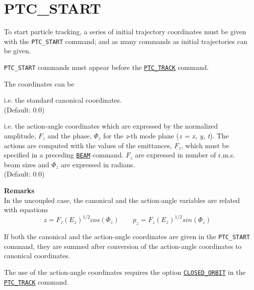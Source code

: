 \section{PTC\_START}
\label{sec:ptc-start}

To start particle tracking, a series of initial trajectory coordinates
must be given with the \texttt{PTC\_START} command;  and as many
commands as initial trajectories can be given. 

\texttt{PTC\_START} commands must appear before the
\hyperref[sec:ptc-track]{\texttt{PTC\_TRACK}} command. 


The coordinates can be 

\begin{madlist}
    i.e. the standard canonical
   coordinates. \\ (Default: 0.0)  

    i.e. the action-angle
   coordinates which are expressed by the normalized amplitude, $F_z$ and
   the phase, $\Phi_z$ for the \textit{z}-th mode plane 
   (\textit{z = x, y, t}).
   The actions are computed with the values of the emittances,
   $F_z$, which must be specified in a preceding 
   \hyperref[sec:beam]{\texttt{BEAM}} command. $F_z$ are expressed in number
   of r.m.s. beam sizes and $\Phi_z$ are expressed in
   radians.\\ (Default: 0.0) 
\end{madlist}


\textbf{Remarks} \\
In the uncoupled case, the canonical and the action-angle
variables are related with equations 
\begin{equation} 
z = F_z (E_z)^{1/2} cos(\Phi_z) \qquad  p_z = F_z (E_z)^{1/2} sin(\Phi_z)
\end{equation}

If both the canonical and the action-angle coordinates are 
given in the \texttt{PTC\_START} command, they are summed after conversion
of the action-angle coordinates to canonical coordinates.

The use of the action-angle coordinates requires the option 
\hyperref[opt:closed-orbit]{\texttt{CLOSED\_ORBIT}} in the 
\hyperref[sec:ptc-track]{\texttt{PTC\_TRACK}} command. 

